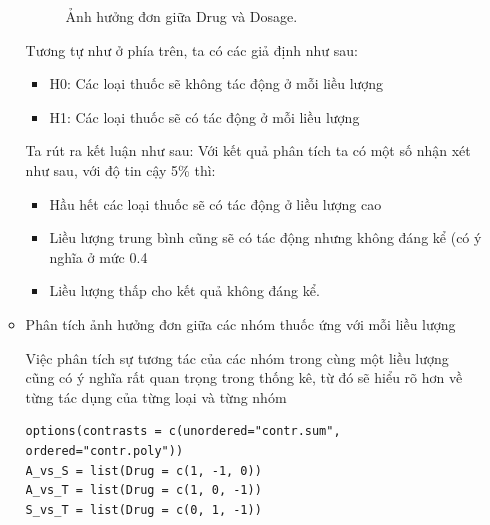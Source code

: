 \begin{itemize}
\begin{itemize}
\begin{figure}[H]
                \caption{Ảnh hưởng đơn giữa Drug và Dosage.}
                \label{fig:Ảnh hưởng đơn giữa Drug và Dosage.}
            \end{figure}
            Tương tự như ở phía trên, ta có các giả định như sau:
            \begin{itemize}
                \item H0: Các loại thuốc sẽ không tác động ở mỗi liều lượng
                \item H1: Các loại thuốc sẽ có tác động ở mỗi liều lượng
            \end{itemize}
        Ta rút ra kết luận như sau: Với kết quả phân tích ta có một số nhận xét như sau, với độ tin cậy 5\% thì:
            \begin{itemize}
                \item Hầu hết các loại thuốc sẽ có tác động ở liều lượng cao
                \item Liều lượng trung bình cũng sẽ có tác động nhưng không đáng kể (có ý nghĩa ở mức 0.4%
                \item Liều lượng thấp cho kết quả không đáng kể.
            \end{itemize}
        \item Phân tích ảnh hưởng đơn giữa các nhóm thuốc ứng với mỗi liều lượng
        
        Việc phân tích sự tương tác của các nhóm trong cùng một liều lượng cũng có ý nghĩa rất quan trọng trong thống kê, từ đó sẽ hiểu rõ hơn về từng tác dụng của từng loại và từng nhóm
        \begin{lstlisting}
options(contrasts = c(unordered="contr.sum", ordered="contr.poly"))
A_vs_S = list(Drug = c(1, -1, 0))
A_vs_T = list(Drug = c(1, 0, -1))
S_vs_T = list(Drug = c(0, 1, -1))
        \end{lstlisting}


\end{itemize}
\end{itemize}
